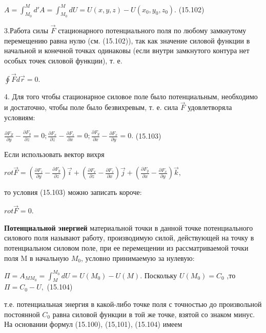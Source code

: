 {\begin{center}
    \par $A=\int_{M_{0}}^{M}d'A=\int_{M_{0}}^{M}dU=U(x,y,z)-U(x_{0},y_{0},z_{0}).$ \qquad (15.102)

    \par 3.Работа силы $ \vec{F}$  стационарного потенциального поля по любому замкнутому перемещению равна нулю (см. (15.102)), так как значение силовой функции в начальной и конечной точках одинаковы (если внутри замкнутого контура нет особых точек силовой функции), т. е.

    \par $\oint \vec{F}d\vec{r} = 0.$

    \par 4. Для того чтобы стационарное силовое поле было потенциальным, необходимо и достаточно, чтобы поле было безвихревым, т. е. сила $\vec{F}$ удовлетворяла условиям:

    \par $ \frac{\partial F_{Z}}{\partial y} - \frac{\partial F_{y}}{\partial z} = 0; \frac{\partial F_{x}}{\partial z} - \frac{\partial F_{z}}{\partial x} = 0; \frac{\partial F_{y}}{\partial x} - \frac{\partial F_{x}}{\partial y} = 0. $ \qquad (15.103)
    
    \par Если использовать вектор вихря

    \par $rot\vec{F} =(\frac{\partial F_{z}}{\partial y} - \frac{\partial F_{y}}{\partial z} )\vec{i} + (\frac{\partial F_{x}}{\partial z} - \frac{\partial F_{z}}{\partial x})\vec{j} +(\frac{\partial F_{y}}{\partial x} - \frac{\partial F_{x}}{\partial y})\vec{k},$

    \par то условия (15.103) можно записать короче:
    \par $rot\vec{F} = 0.$
    
    \par \textbf{Потенциальной энергией} материальной точки в данной точке потенциального силового поля называют работу, производимую силой, действующей на точку в потенциальном силовом поле, при ее перемещении из рассматриваемой точки поля M в начальную $M_{0}$, условно принимаемую за нулевую:

    \par $ \Pi = A_{MM_{0}} = \int_M^{M_{0}}dU = U(M_{0}) - U(M).$ Поскольку $U(M_{0}) = C_{0} $ ,то $ \Pi = C_{0} - U,$ \qquad (15.104)

    \par т.е. потенциальная энергия в какой-либо точке поля с точностью до произвольной постоянной $C_{0}$ равна  силовой  функции в  той же  точке,  взятой со знаком минус. На основании формул (15.100), (15,101), (15.104) имеем


\end{center}}
